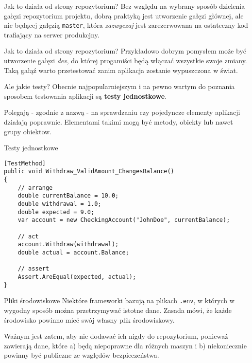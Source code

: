 \begin{frame}{Jak to działa od strony repozytorium?}
	Bez względu na wybrany sposób dzielenia gałęzi repozytorium projektu, dobrą praktyką jest utworzenie gałęzi głównej, ale nie będącej gałęzią \texttt{master}, która \emph{zazwyczaj} jest zarezerwowana na ostateczny kod trafiający na serwer produkcjny.
\end{frame}

\begin{frame}{Jak to działa od strony repozytorium?}
	Przykładowo dobrym pomysłem może być utworzenie gałęzi \emph{dev}, do której progamiści będą włączać wszystkie swoje zmiany. Taką gałąź warto przetestować zanim aplikacja zostanie wypuszczona w świat.
\end{frame}

\begin{frame}[fragile]{Ale jakie testy?}
	Obecnie najpopularniejszym i na pewno wartym do poznania sposobem testowania aplikacji są \textbf{testy jednostkowe}. 
	
	Polegają - zgodnie z nazwą - na sprawdzaniu czy pojedyncze elementy aplikacji działają poprawnie. Elementami takimi mogą być metody, obiekty lub nawet grupy obiektow.
\end{frame}

\begin{frame}[fragile]{Testy jednostkowe}
	\begin{lstlisting}
[TestMethod]  
public void Withdraw_ValidAmount_ChangesBalance()  
{  
    // arrange  
    double currentBalance = 10.0;  
    double withdrawal = 1.0;  
    double expected = 9.0;  
    var account = new CheckingAccount("JohnDoe", currentBalance);  
    
    // act  
    account.Withdraw(withdrawal);  
    double actual = account.Balance;  
    
    // assert  
    Assert.AreEqual(expected, actual);  
} 
	\end{lstlisting}
\end{frame}

\begin{frame}{Pliki środowiskowe}
	Niektóre frameworki bazują na plikach \texttt{.env}, w których w wygodny sposób można przetrzymywać istotne dane. Zasada mówi, że każde środowisko powinno mieć swój własny plik środowiskowy.
	
	Ważnym jest zatem, aby nie dodawać ich nigdy do repozytorium, ponieważ zawierają dane, które a) będą niepoprawne dla różnych maszyn i b) niekoniecznie powinny być publiczne ze względów bezpieczeństwa.
\end{frame}

